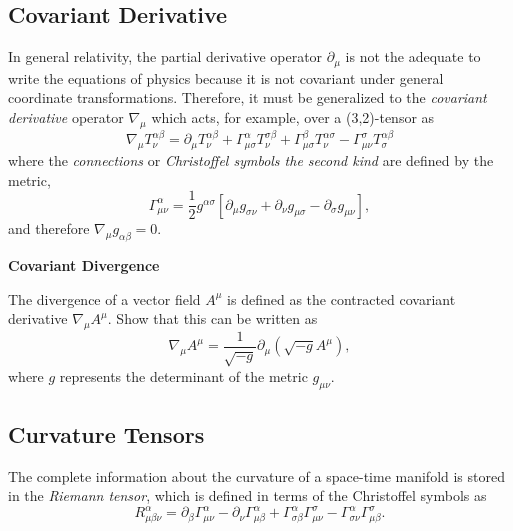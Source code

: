 \subsection{Covariant Derivative}
In general relativity, the partial derivative operator $\partial_\mu$ is not the adequate to write the equations of physics because it is not covariant under general coordinate transformations. Therefore, it must be generalized to the \textit{covariant derivative} operator $\nabla _\mu$ which acts, for example, over a (3,2)-tensor as
\begin{equation}
\nabla _\mu T^{\alpha \beta}_{\nu} = \partial_\mu T^{\alpha \beta}_{\nu}  + \Gamma^\alpha_{\mu \sigma} T^{\sigma \beta}_{\nu} + \Gamma^\beta _{\mu \sigma} T^{\alpha \sigma}_{\nu} - \Gamma^\sigma _{\mu \nu} T^{\alpha \beta}_{\sigma} 
\end{equation}
where the \textit{connections} or \textit{Christoffel symbols the second kind} are defined by the metric,
\begin{equation}
\Gamma ^\alpha _{\mu \nu} = \frac{1}{2}g^{\alpha \sigma} \left[  \partial_\mu g_{\sigma \nu}+  \partial_\nu g_{\mu \sigma} - \partial_\sigma g_{\mu \nu} \right],
\end{equation}
and therefore  $\nabla _\mu g_{\alpha \beta} = 0$.

\begin{exercise}
\textbf{Covariant Divergence}

The divergence of a vector field $A^\mu$ is defined as the contracted covariant derivative $\nabla _\mu A^\mu$. Show that this can be written as
\begin{equation}
\nabla _\mu A^\mu = \frac{1}{\sqrt{-g}} \partial_\mu \left ( \sqrt{-g} A^\mu \right), \label{eq:CovariantDivergence}
\end{equation}
where $g$ represents the determinant of the metric $g_{\mu \nu}$.
\end{exercise}

\subsection{Curvature Tensors}
The complete information about the curvature of a space-time manifold is stored in the \textit{Riemann tensor}, which is defined in terms of the Christoffel symbols as
\begin{equation}
R^\alpha_{\mu \beta \nu} = \partial_\beta \Gamma^\alpha_{\mu \nu} - \partial_\nu \Gamma^\alpha_{\mu \beta} + \Gamma^\alpha_{\sigma \beta} \Gamma^\sigma_{\mu \nu} - \Gamma^\alpha_{\sigma \nu} \Gamma^\sigma_{\mu \beta}. \label{eq:RiemannTensor}
\end{equation}

